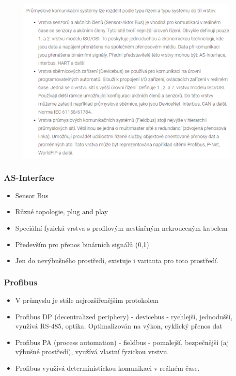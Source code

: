 \begin{figure}[!h]
    \begin{center}
        \includegraphics[scale = 1]{img/Picture18.png}
    \end{center}
\end{figure}

\newpage

\subsubsection*{AS-Interface}
\begin{itemize}
    \item Sensor Bus
    \item Různé topologie, plug and play
    \item Speciální fyzická vrstva s profilovým nestíněným nekrouceným kabelem
    \item Především pro přenos binárních signálů (0,1)
    \item Jen do nevýbušného prostředí, existuje i varianta pro toto prostředí.
\end{itemize}

\subsubsection*{Profibus}

\begin{itemize}
    \item V průmyslu je stále nejrozšířenějším protokolem
    \item Profibus DP (decentralized periphery) - devicebus - rychlejší, jednodušší, využívá RS-485, optika. Optimalizován na výkon, cyklický přenos dat
    \item Profibus PA (process automation) - fieldbus - pomalejší, bezpečnější (aj výbušné prostředí), využívá vlastní fyzickou vrstvu.
    \item Profibus využívá deterministickou komunikaci v reálném čase.
\end{itemize}

